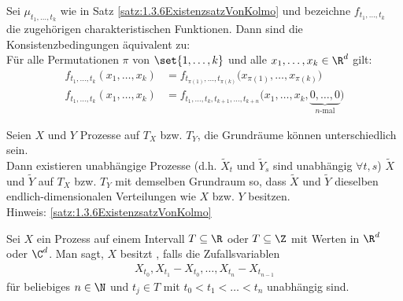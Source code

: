 \begin{aufgabenr}\label{aufg:6}\enter
	Sei $\mu_{t_1,\ldots,t_k}$ wie in Satz \ref{satz:1.3.6ExistenzsatzVonKolmo} und bezeichne $f_{t_1,\ldots,t_k}$ die zugehörigen charakteristischen Funktionen.
	Dann sind die Konsistenzbedingungen äquivalent zu:\\
		Für alle Permutationen $\pi$ von $\set{1,\ldots,k}$ und alle $x_1,\ldots,x_k\in\R^d$ gilt:
		\begin{align*}
			f_{t_1,\ldots,t_k}(x_1,\ldots,x_k)&=f_{t_{\pi(1)},\ldots,t_{\pi(k)}}\big(x_{\pi(1)},\ldots,x_{\pi(k)}\big)\\
			f_{t_1,\ldots,t_k}(x_1,\ldots,x_k)
			&=f_{t_1,\ldots,t_k,t_{k+1},\ldots,t_{k+n}}\big(x_1,\ldots,x_k,\underbrace{0,\ldots,0}_{n\text{-mal}}\big)
		\end{align*}
\end{aufgabenr}

\begin{aufgabenr}\label{aufg:7}
	Seien $X$ und $Y$ Prozesse auf $T_X$ bzw. $T_Y$, die Grundräume können unterschiedlich sein.\\
	Dann existieren unabhängige Prozesse (d.h. $\tilde{X}_t$ und $\tilde{Y}_s$ sind unabhängig $\forall t,s$) $\tilde{X}$ und $\tilde{Y}$ auf $T_X$ bzw. $T_Y$ mit demselben Grundraum so, dass $\tilde{X}$ und $\tilde{Y}$ dieselben endlich-dimensionalen Verteilungen wie $X$ bzw. $Y$ besitzen.\\
	Hinweis: \ref{satz:1.3.6ExistenzsatzVonKolmo}
\end{aufgabenr}

\setcounter{satz}{9} %

\begin{definition}
	Sei $X$ ein Prozess auf einem Intervall $T\subseteq\R$ oder $T\subseteq\Z$ mit Werten in $\R^d$ oder $\C^d$.
	Man sagt, $X$ besitzt , falls die Zufallsvariablen 
	\begin{align*}
		X_{t_0},X_{t_1}-X_{t_0},\ldots,X_{t_n}-X_{t_{n-1}}	
	\end{align*}
	für beliebiges $n\in\N$ und $t_j\in T$ mit $t_0<t_1<\ldots<t_n$ unabhängig sind.
\end{definition}

